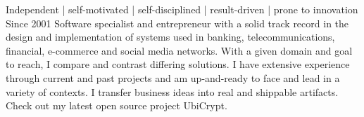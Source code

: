 

\begin{cventries}
  \cventry
    {} %
    {Independent | self-motivated | self-disciplined | result-driven | prone to innovation}
    {} %
    {Since 2001} %
    {
      Software specialist and entrepreneur with a solid track record in the  design and implementation of systems used in banking, telecommunications, financial, e-commerce and social media networks.
      With a given domain and  goal to reach, I compare and contrast differing solutions. I have extensive experience through current and past projects and am up-and-ready to face and lead in a variety of contexts.
      I transfer business ideas into real and shippable artifacts. Check out my latest open source project UbiCrypt.
    }


\end{cventries}
